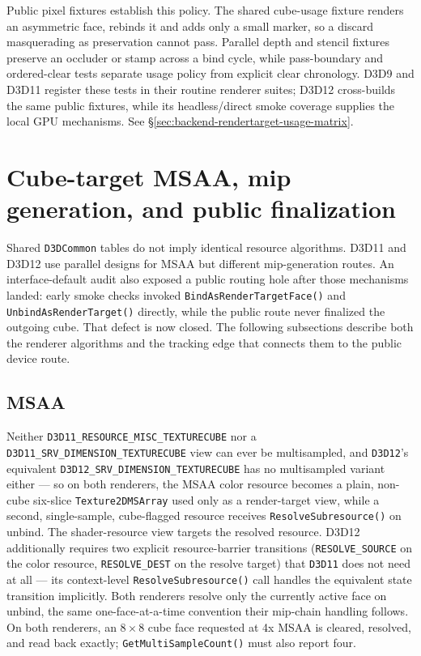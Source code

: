 Public pixel fixtures establish this policy. The shared
cube-usage fixture renders an asymmetric face, rebinds it and adds only a small marker, so a
discard masquerading as preservation cannot pass. Parallel depth and stencil fixtures preserve
an occluder or stamp across a bind cycle, while pass-boundary and ordered-clear tests separate
usage policy from explicit clear chronology. D3D9 and D3D11 register these tests in their routine
renderer suites; D3D12 cross-builds the same public fixtures, while its headless/direct smoke
coverage supplies the local GPU mechanisms. See \S\ref{sec:backend-rendertarget-usage-matrix}.

\section{Cube-target MSAA, mip generation, and public finalization}

Shared \texttt{D3DCommon} tables do not imply identical resource algorithms. D3D11 and D3D12
use parallel designs for  MSAA but different mip-generation routes.
An interface-default audit also exposed a public routing hole after those mechanisms landed:
early smoke checks invoked \texttt{BindAsRenderTargetFace()} and
\texttt{UnbindAsRenderTarget()} directly, while the public route never finalized the outgoing
cube. That defect is now closed. The following subsections describe both the renderer algorithms
and the tracking edge that connects them to the public device route.

\subsection{ MSAA}

Neither \texttt{D3D11\_RESOURCE\_MISC\_TEXTURECUBE} nor
a \texttt{D3D11\_SRV\_DIMENSION\_TEXTURECUBE} view can ever be multisampled, and \texttt{D3D12}'s
equivalent \texttt{D3D12\_SRV\_DIMENSION\_TEXTURECUBE} has no multisampled variant either --- so
on both renderers, the MSAA color resource becomes a plain, non-cube six-slice
\texttt{Texture2DMSArray} used only as a render-target view, while a second, single-sample,
cube-flagged resource receives \texttt{ResolveSubresource()} on unbind. The shader-resource view
targets the resolved resource. D3D12 additionally requires two explicit
resource-barrier transitions (\texttt{RESOLVE\_SOURCE} on the color resource,
\texttt{RESOLVE\_DEST} on the resolve target) that \texttt{D3D11} does not need at all --- its
context-level \texttt{ResolveSubresource()} call handles the equivalent state transition
implicitly. Both renderers resolve only the currently active face on unbind, the same
one-face-at-a-time convention their mip-chain handling follows. On both renderers, an
$8\times8$ cube face requested at 4x MSAA is cleared, resolved, and read back exactly;
\texttt{GetMultiSampleCount()} must also report four.

